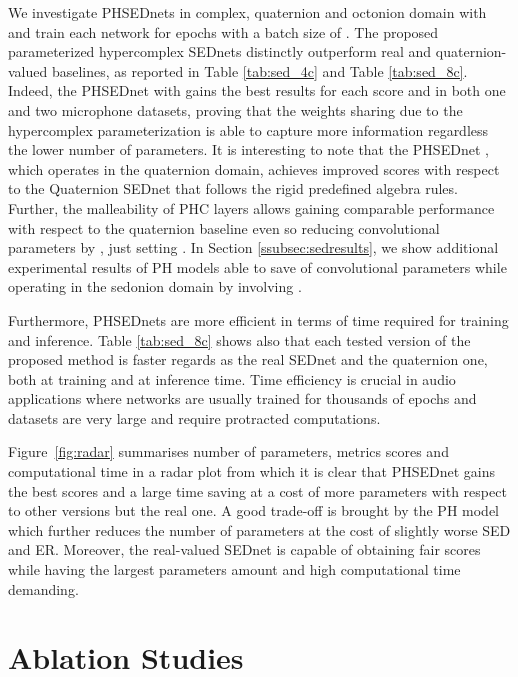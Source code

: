 \documentclass[lettersize,journal]{IEEEtran}
\begin{document}
We investigate PHSEDnets in complex, quaternion and octonion domain with  and train each network for  epochs with a batch size of .
The proposed parameterized hypercomplex SEDnets distinctly outperform real and quaternion-valued baselines, as reported in Table \ref{tab:sed_4c} and Table \ref{tab:sed_8c}. Indeed, the PHSEDnet with  gains the best results for each score and in both one and two microphone datasets, proving that the weights sharing due to the hypercomplex parameterization is able to capture more information regardless the lower number of parameters. It is interesting to note that the PHSEDnet , which operates in the quaternion domain, achieves improved scores with respect to the Quaternion SEDnet that follows the rigid predefined algebra rules. Further, the malleability of PHC layers allows gaining comparable performance with respect to the quaternion baseline even so reducing convolutional parameters by , just setting . In Section \ref{ssubsec:sedresults}, we show additional experimental results of PH models able to save  of convolutional parameters while operating in the sedonion domain by involving .

Furthermore, PHSEDnets are more efficient in terms of time required for training and inference. Table \ref{tab:sed_8c} shows also that each tested version of the proposed method is faster regards as the real SEDnet and the quaternion one, both at training and at inference time. Time efficiency is crucial in audio applications where networks are usually trained for thousands of epochs and datasets are very large and require protracted computations.

Figure~\ref{fig:radar} summarises number of parameters, metrics scores and computational time in a radar plot from which it is clear that PHSEDnet  gains the best scores and a large time saving at a cost of more parameters with respect to other versions but the real one. A good trade-off is brought by the PH model  which further reduces the number of parameters at the cost of slightly worse SED and ER. Moreover, the real-valued SEDnet is capable of obtaining fair scores while having the largest parameters amount and high computational time demanding.







\section{Ablation Studies}
\label{sec:abl}
\end{document}
